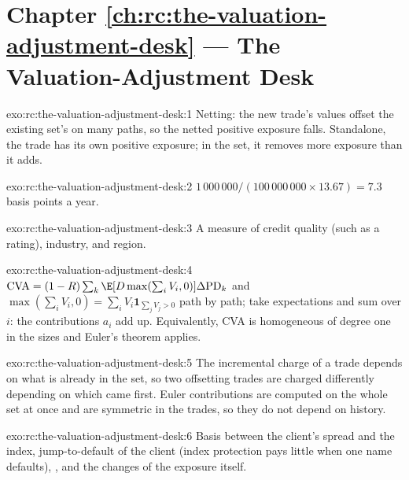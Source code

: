 \section*{Chapter \ref{ch:rc:the-valuation-adjustment-desk} --- The Valuation-Adjustment Desk}

\begin{solution}{exo:rc:the-valuation-adjustment-desk:1}
Netting: the new trade's values offset the existing set's on many paths, so the netted positive
exposure falls. Standalone, the trade has its own positive exposure; in the set, it removes more
exposure than it adds.
\end{solution}

\begin{solution}{exo:rc:the-valuation-adjustment-desk:2}
$1\,000\,000/(100\,000\,000\times13.67) = 7.3$ basis points a year.
\end{solution}

\begin{solution}{exo:rc:the-valuation-adjustment-desk:3}
A measure of credit quality (such as a rating), industry, and region.
\end{solution}

\begin{solution}{exo:rc:the-valuation-adjustment-desk:4}
$\mathrm{CVA} = (1-R)\sum_k\E[D\max(\sum_iV_i,0)]\Delta\mathrm{PD}_k$ and
$\max(\sum_iV_i,0) = \sum_iV_i\mathbf 1_{\sum_jV_j>0}$ path by path; take expectations and sum over $i$:
the contributions $a_i$ add up. Equivalently, CVA is homogeneous of degree one in the sizes and
Euler's theorem applies.
\end{solution}

\begin{solution}{exo:rc:the-valuation-adjustment-desk:5}
The incremental charge of a trade depends on what is already in the set, so two offsetting
trades are charged differently depending on which came first. Euler contributions are computed on
the whole set at once and are symmetric in the trades, so they do not depend on history.
\end{solution}

\begin{solution}{exo:rc:the-valuation-adjustment-desk:6}
Basis between the client's spread and the index, jump-to-default of the client (index protection
pays little when one name defaults), , and the changes of the exposure itself.
\end{solution}

